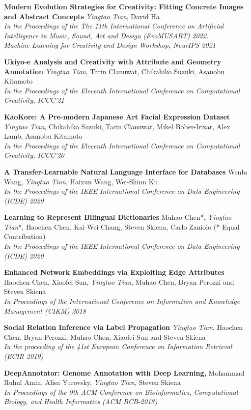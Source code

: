 \documentclass[line,margin]{cv}
\begin{document}
\begin{resume}
  {\bf Modern Evolution Strategies for Creativity: Fitting Concrete Images and Abstract Concepts}
  \emph{Yingtao Tian}, David Ha\\
  \emph{In the Proceedings of the The 11th International Conference on Artificial Intelligence in Music, Sound, Art and Design (EvoMUSART) 2022.\\
  Machine Learning for Creativity and Design Workshop, NeurIPS 2021}

	{\bf  Ukiyo-e Analysis and Creativity with Attribute and Geometry Annotation}
	\emph{Yingtao Tian}, Tarin Clanuwat, Chikahiko Suzuki, Asanobu Kitamoto\\
	\emph{In the Proceedings of the Eleventh International Conference on Computational Creativity, ICCC'21}

	{\bf  KaoKore: A Pre-modern Japanese Art Facial Expression Dataset}
	\emph{Yingtao Tian}, Chikahiko Suzuki, Tarin Clanuwat, Mikel Bober-Irizar, Alex Lamb, Asanobu Kitamoto\\
	\emph{In the Proceedings of the Eleventh International Conference on Computational Creativity, ICCC'20}

	{\bf  A Transfer-Learnable Natural Language Interface for Databases}
	Wenlu Wang, \emph{Yingtao Tian}, Haixun Wang, Wei-Shinn Ku\\
	\emph{In the Proceedings of the IEEE International Conference on Data Engineering (ICDE) 2020}
	
	{\bf  Learning to Represent Bilingual Dictionaries}
	Muhao Chen*, \emph{Yingtao Tian}*, Haochen Chen, Kai-Wei Chang, Steven Skiena, Carlo Zaniolo  (* Equal Contribution)\\
	\emph{In the Proceedings of the IEEE International Conference on Data Engineering (ICDE) 2020}
	
	{\bf  Enhanced Network Embeddings via Exploiting Edge Attributes}
	 Haochen Chen, Xiaofei Sun, \emph{Yingtao Tian}, Muhao Chen, Bryan Perozzi and Steven Skiena\\
	\emph{In Proceedings of the International Conference on Information and Knowledge Management (CIKM) 2018}

	{\bf Social Relation Inference via Label Propagation}
	\emph{Yingtao Tian}, Haochen Chen, Bryan Perozzi, Muhao Chen, Xiaofei Sun and Steven Skiena\\
	\emph{In the proceeding of the 41st European Conference on Information Retrieval (ECIR 2019)}
	
	{\bf DeepAnnotator: Genome Annotation with Deep Learning,}
	Mohammad Ruhul Amin, Alisa Yurovsky, \emph{Yingtao Tian}, Steven Skiena \\
	\emph{In Proceedings of the 9th ACM Conference on Bioinformatics, Computational Biology, and Health Informatics (ACM BCB-2018)}
	

\end{resume}
\end{document}
